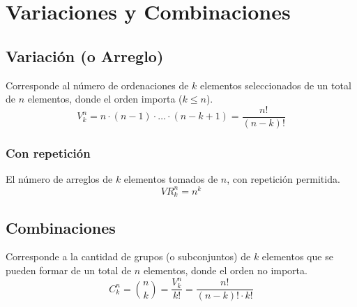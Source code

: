\documentclass[12pt, letterpaper]{article}
\begin{document}
\section{Variaciones y Combinaciones}
\subsection{Variación (o Arreglo)}
Corresponde al número de ordenaciones de $k$ elementos seleccionados de un total de $n$ elementos, donde el orden importa ($k \le n$).
\[V_k^n = n \cdot (n - 1) \cdot \dots \cdot (n - k + 1) = \frac{n!}{(n - k)!} \]
\subsubsection*{Con repetición}
El número de arreglos de $k$ elementos tomados de $n$, con repetición permitida.
\[VR_k^n = n^k \]

\subsection{Combinaciones} Corresponde a la cantidad de grupos (o subconjuntos) de $k$ elementos que se pueden formar de un total de $n$ elementos, donde el orden no importa.
\[C_k^n = \binom{n}{k} = \frac{V_k^n}{k!} = \frac{n!}{(n - k)! \cdot k!} \]
\end{document}
